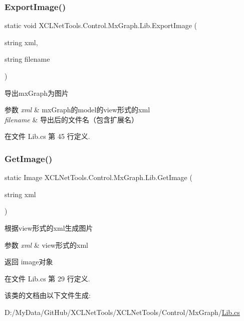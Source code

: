 \subsubsection{\texorpdfstring{Export\+Image()}{ExportImage()}}
{\footnotesize\ttfamily static void X\+C\+L\+Net\+Tools.\+Control.\+Mx\+Graph.\+Lib.\+Export\+Image (\begin{DoxyParamCaption}\item[{string}]{xml,  }\item[{string}]{filename }\end{DoxyParamCaption})\hspace{0.3cm}{\ttfamily [static]}}



导出mx\+Graph为图片 


\begin{DoxyParams}{参数}
{\em xml} & mx\+Graph的model的view形式的xml\\
\hline
{\em filename} & 导出后的文件名（包含扩展名）\\
\hline
\end{DoxyParams}


在文件 Lib.\+cs 第 45 行定义.

\mbox{\label{class_x_c_l_net_tools_1_1_control_1_1_mx_graph_1_1_lib_abff455d51f61485d6bf26e0133af6000}} 
\subsubsection{\texorpdfstring{Get\+Image()}{GetImage()}}
{\footnotesize\ttfamily static Image X\+C\+L\+Net\+Tools.\+Control.\+Mx\+Graph.\+Lib.\+Get\+Image (\begin{DoxyParamCaption}\item[{string}]{xml }\end{DoxyParamCaption})\hspace{0.3cm}{\ttfamily [static]}}



根据view形式的xml生成图片 


\begin{DoxyParams}{参数}
{\em xml} & view形式的xml\\
\hline
\end{DoxyParams}
\begin{DoxyReturn}{返回}
image对象
\end{DoxyReturn}


在文件 Lib.\+cs 第 29 行定义.



该类的文档由以下文件生成\+:\begin{DoxyCompactItemize}
\item 
D\+:/\+My\+Data/\+Git\+Hub/\+X\+C\+L\+Net\+Tools/\+X\+C\+L\+Net\+Tools/\+Control/\+Mx\+Graph/\hyperlink{_control_2_mx_graph_2_lib_8cs}{Lib.\+cs}\end{DoxyCompactItemize}
